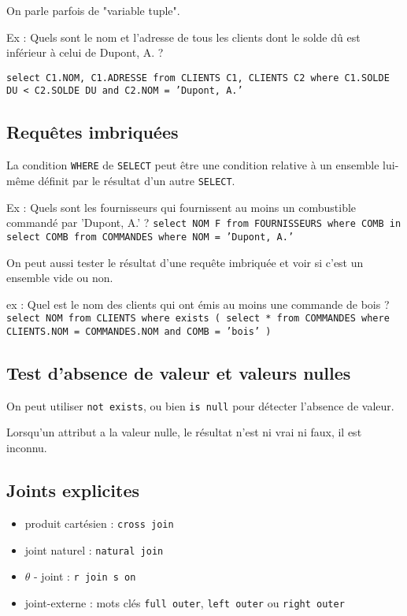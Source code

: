 	 	On parle parfois de "variable tuple".
	 	
	 	Ex : Quels sont le nom et l'adresse de tous les clients dont le solde dû est
inférieur à celui de Dupont, A. ?

\texttt{select C1.NOM, C1.ADRESSE from CLIENTS C1, CLIENTS C2 where C1.SOLDE DU < C2.SOLDE DU and C2.NOM = 'Dupont, A.'}

		
		\subsection{Requêtes imbriquées}
		
		La condition \texttt{WHERE} de \texttt{SELECT} peut être une condition relative à un ensemble lui-même définit par le résultat d'un autre \texttt{SELECT}.

		Ex : Quels sont les fournisseurs qui fournissent au moins un combustible commandé par 'Dupont, A.' ?
		\texttt{select NOM F
from FOURNISSEURS
where COMB in  
select COMB
from COMMANDES
where NOM = 'Dupont, A.'}
		
		On peut aussi tester le résultat d'une requête imbriquée et voir si c'est un ensemble vide ou non.
		
		ex : Quel est le nom des clients qui ont émis au moins une commande de bois ?
		\texttt{select NOM from CLIENTS where exists
( select * from COMMANDES where CLIENTS.NOM = COMMANDES.NOM and COMB = 'bois' )}

		\subsection{Test d'absence de valeur et valeurs nulles}
		
		On peut utiliser \texttt{not exists}, ou bien \texttt{is null} pour détecter l'absence de valeur.
		
		Lorsqu'un attribut a la valeur nulle, le résultat n'est ni vrai ni faux, il est inconnu.
		
		\subsection{Joints explicites}
		
		\begin{itemize}
			\item produit cartésien : \texttt{cross join}
			\item joint naturel : \texttt{natural join}
			\item $\theta$ - joint : \texttt{r join s on }
			\item joint-externe : mots clés \texttt{full outer}, \texttt{left outer} ou \texttt{right outer}
		\end{itemize}
			
